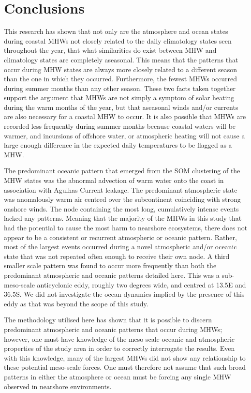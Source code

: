 \documentclass[utf8]{frontiersSCNS}
\begin{document}
\section{Conclusions}
This research has shown that not only are the atmosphere and ocean states during coastal MHWs not closely related to the daily climatology states seen throughout the year, that what similarities do exist between MHW and climatology states are completely aseasonal. This means that the patterns that occur during MHW states are always more closely related to a different season than the one in which they occurred. Furthermore, the fewest MHWs occurred during summer months than any other season. These two facts taken together support the argument that MHWs are not simply a symptom of solar heating during the warm months of the year, but that aseasonal winds and/or currents are also necessary for a coastal MHW to occur. It is also possible that MHWs are recorded less frequently during summer months because coastal waters will be warmer, and incursions of offshore water, or atmospheric heating will not cause a large enough difference in the expected daily temperatures to be flagged as a MHW.

The predominant oceanic pattern that emerged from the SOM clustering of the MHW states was the abnormal advection of warm water onto the coast in association with Agulhas Current leakage. The predominant atmospheric state was anomalously warm air centred over the subcontinent coinciding with strong onshore winds. The node containing the most long, cumulatively intense events lacked any patterns. Meaning that the majority of the MHWs in this study that had the potential to cause the most harm to nearshore ecosystems, there does not appear to be a consistent or recurrent atmospheric or oceanic pattern. Rather, most of the largest events occurred during a novel atmospheric and/or oceanic state that was not repeated often enough to receive their own node. A third smaller scale pattern was found to occur more frequently than both the predominant atmospheric and oceanic patterns detailed here. This was a sub-meso-scale anticyclonic eddy, roughly two degrees wide, and centred at 13.5\degree E and 36.5\degree S. We did not investigate the ocean dynamics implied by the presence of this eddy as that was beyond the scope of this study.

The methodology utilised here has shown that it is possible to discern predominant atmospheric and oceanic patterns that occur during MHWs; however, one must have knowledge of the meso-scale oceanic and atmospheric properties of the study area in order to correctly interrogate the results. Even with this knowledge, many of the largest MHWs did not show any relationship to these potential meso-scale forces. One must therefore not assume that such broad patterns in either the atmosphere or ocean must be forcing any single MHW observed in nearshore environments.
\end{document}
